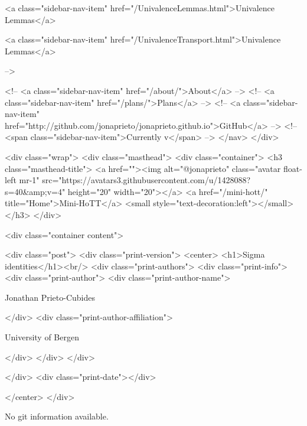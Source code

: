       
    
      
        
          <a class="sidebar-nav-item" href="/UnivalenceLemmas.html">Univalence Lemmas</a>
        
      
    
      
        
          <a class="sidebar-nav-item" href="/UnivalenceTransport.html">Univalence Lemmas</a>
        
      
     -->

    <!-- <a class="sidebar-nav-item" href="/about/">About</a> -->
    <!-- <a class="sidebar-nav-item" href="/plans/">Plans</a> -->
    <!-- <a class="sidebar-nav-item" href="http://github.com/jonaprieto/jonaprieto.github.io">GitHub</a> -->
    <!-- <span class="sidebar-nav-item">Currently v</span> -->
  </nav>
</div>

    <div class="wrap">
      <div class="masthead">
        <div class="container">
          <h3 class="masthead-title">
            <a href=""><img alt="@jonaprieto" class="avatar float-left mr-1" src="https://avatars3.githubusercontent.com/u/1428088?s=40&amp;v=4" height="20" width="20"></a>
            <a href="/mini-hott/" title="Home">Mini-HoTT</a>
            <small style="text-decoration:left"></small>
          </h3>
        </div>
      
      <div class="container content">
        







<div class="post">
  <div class="print-version">
    <center>
      <h1>Sigma identities</h1><br/>
        <div class="print-authors">
          <div class="print-info">
            <div class="print-author">
              <div class="print-author-name">
                
                  Jonathan Prieto-Cubides
                
              </div>
              <div class="print-author-affiliation">
                
                  University of Bergen
                
                </div>
            </div>
          </div>
          
          
        </div>
        <div class="print-date"></div>
        
        
    </center>
  </div>

  
  No git information available.
  


